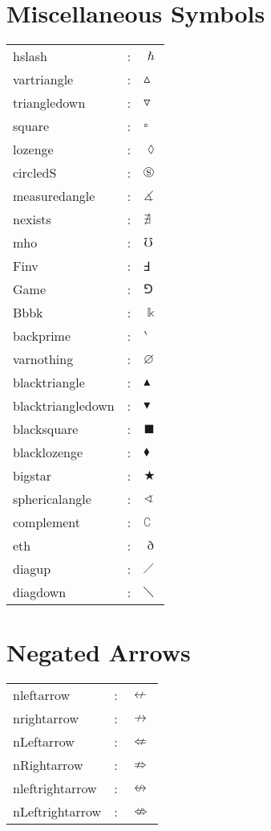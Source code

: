 \documentclass{article}
\begin{document}
\section{Miscellaneous Symbols}
\begin{tabular}{lll} 
hslash & : & $\hslash$\\
vartriangle & : & $\vartriangle$\\
triangledown & : & $\triangledown$\\
square & : & $\square$\\  
lozenge & : & $\lozenge$\\
circledS & : & $\circledS$\\
measuredangle & : & $\measuredangle$\\
nexists & : & $\nexists$\\
mho & : & $\mho$\\
Finv & : & $\Finv$\\
Game & : & $\Game$\\
Bbbk & : & $\Bbbk$\\
backprime & : & $\backprime$\\
varnothing & : & $\varnothing$\\
blacktriangle & : & $\blacktriangle$\\
blacktriangledown & : & $\blacktriangledown$\\
blacksquare & : & $\blacksquare$\\
blacklozenge & : & $\blacklozenge$\\
bigstar & : & $\bigstar$\\
sphericalangle & : & $\sphericalangle$\\
complement & : & $\complement$\\
eth & : & $\eth$\\
diagup & : & $\diagup$\\
diagdown & : & $\diagdown$
\end{tabular}

\section{Negated Arrows}
\begin{tabular}{lll} 
nleftarrow & : & $\nleftarrow$\\
nrightarrow & : & $\nrightarrow$\\
nLeftarrow & : & $\nLeftarrow$\\
nRightarrow & : & $\nRightarrow$\\
nleftrightarrow & : & $\nleftrightarrow$\\
nLeftrightarrow & : & $\nLeftrightarrow$
\end{tabular}
\end{document}
